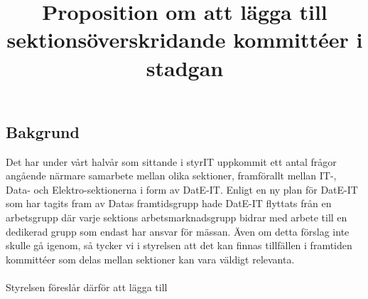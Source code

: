 \documentclass[11pt, noincludeaddress, nopagination]{classes/cthit}
\begin{document}
\title{Proposition om att lägga till sektionsöverskridande kommittéer i stadgan}

\makeheadfoot%

\makesimpletitle

\subsection*{Bakgrund}
Det har under vårt halvår som sittande i styrIT uppkommit ett antal frågor angående närmare samarbete mellan olika sektioner, framförallt mellan IT-, Data- och Elektro-sektionerna i form av DatE-IT. 
Enligt en ny plan för DatE-IT som har tagits fram av Datas framtidsgrupp hade DatE-IT flyttats från en arbetsgrupp där varje sektions arbetsmarknadsgrupp bidrar med arbete till en dedikerad grupp som endast har ansvar för mässan. Även om detta förslag inte skulle gå igenom, så tycker vi i styrelsen att det kan finnas tillfällen i framtiden kommittéer som delas mellan sektioner kan vara väldigt relevanta.
\\\\
Styrelsen föreslår därför att lägga till 
\end{document}
